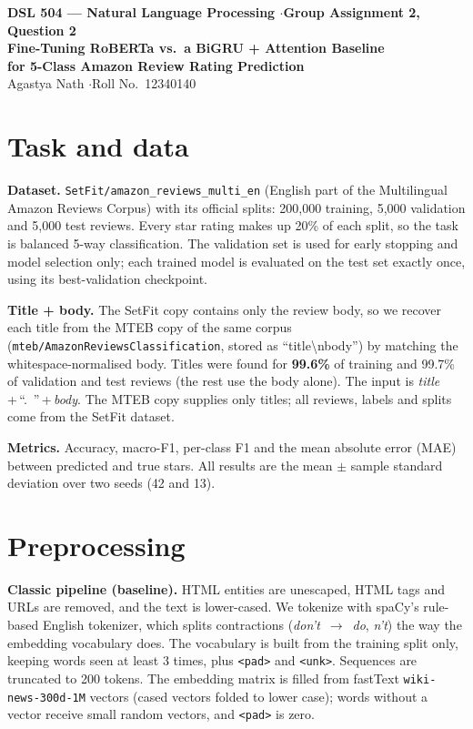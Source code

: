 \documentclass[11pt,a4paper]{article}
\begin{document}
\begin{center}
{\large\bfseries DSL 504 --- Natural Language Processing \quad$\cdot$\quad Group Assignment 2, Question 2}\\[4pt]
{\LARGE\bfseries Fine-Tuning RoBERTa vs.\ a BiGRU + Attention Baseline\\[2pt] for 5-Class Amazon Review Rating Prediction}\\[6pt]
{\normalsize Agastya Nath \quad$\cdot$\quad Roll No.\ 12340140}
\end{center}



\section{Task and data}
\textbf{Dataset.} \texttt{SetFit/amazon\_reviews\_multi\_en} (English part of the Multilingual Amazon Reviews Corpus) with its official splits: 200{,}000 training, 5{,}000 validation and 5{,}000 test reviews. Every star rating makes up 20\% of each split, so the task is balanced 5-way classification. The validation set is used for early stopping and model selection only; each trained model is evaluated on the test set exactly once, using its best-validation checkpoint.

\textbf{Title + body.} The SetFit copy contains only the review body, so we recover each title from the MTEB copy of the same corpus (\texttt{mteb/AmazonReviewsClassification}, stored as ``title\textbackslash nbody'') by matching the whitespace-normalised body. Titles were found for \textbf{99.6\%} of training and 99.7\% of validation and test reviews (the rest use the body alone). The input is \textit{title}\,+\,``.~''\,+\,\textit{body}. The MTEB copy supplies only titles; all reviews, labels and splits come from the SetFit dataset.

\textbf{Metrics.} Accuracy, macro-F1, per-class F1 and the mean absolute error (MAE) between predicted and true stars. All results are the mean $\pm$ sample standard deviation over two seeds (42 and 13).

\section{Preprocessing}
\textbf{Classic pipeline (baseline).} HTML entities are unescaped, HTML tags and URLs are removed, and the text is lower-cased. We tokenize with spaCy's rule-based English tokenizer, which splits contractions (\textit{don't}~$\rightarrow$~\textit{do}, \textit{n't}) the way the embedding vocabulary does. The vocabulary is built from the training split only, keeping words seen at least 3 times, plus \texttt{<pad>} and \texttt{<unk>}. Sequences are truncated to 200 tokens. The embedding matrix is filled from fastText \texttt{wiki-news-300d-1M} vectors (cased vectors folded to lower case); words without a vector receive small random vectors, and \texttt{<pad>} is zero.
\end{document}
